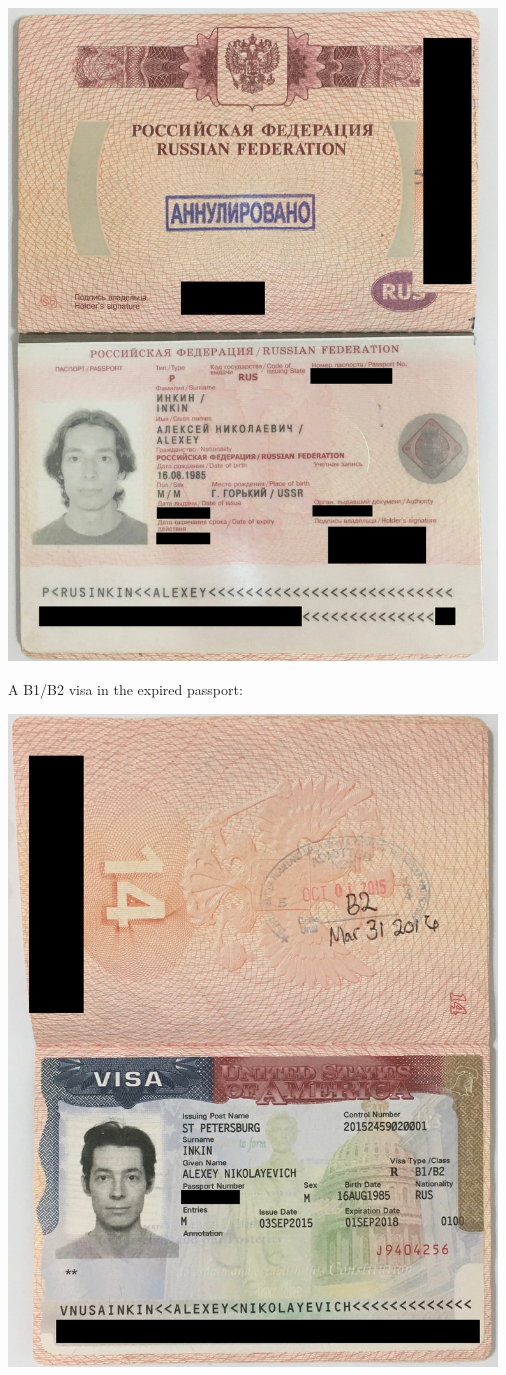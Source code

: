 \includegraphics[width=35em]{02-03_public}
\pagebreak

A B1/B2 visa in the expired passport:

\includegraphics[width=35em]{14-15_public}
\pagebreak
